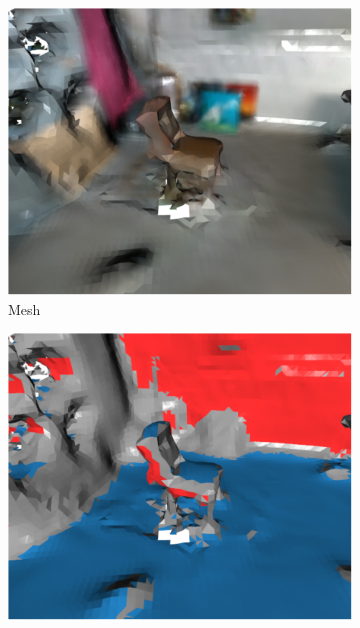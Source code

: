 \vspace{-12pt}
\begin{figure}[!ht]
\centering
  \begin{subfigure}[t]{.22\linewidth}
    \centering\includegraphics[clip,trim=0cm 0cm 0cm 0cm, width=.99\linewidth]{chapter_3_polylidar3d/imgs/meshes/planar_segment-region_a_v2.pdf}
    \caption{Mesh\label{fig:ch3_planar_seg_a}}\vspace{6pt}
  \end{subfigure}
  \hfill
  \begin{subfigure}[t]{.22\linewidth}
    \centering\includegraphics[clip,trim=0cm 0cm 0cm 0cm,width=.99\linewidth]{chapter_3_polylidar3d/imgs/meshes/planar_segment-region_b.pdf}

\end{subfigure}
\end{figure}
